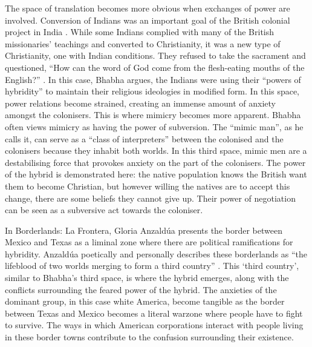 	The space of translation becomes more obvious when exchanges of power are involved. Conversion of Indians was an important goal of the British colonial project in India \parencite {Bhabha_1994}. While some Indians complied with many of the British missionaries’ teachings and converted to Christianity, it was a new type of Christianity, one with Indian conditions. They refused to take the sacrament and questioned, “How can the word of God come from the flesh-eating mouths of the English?” \parencite[166] {Bhabha_1994}. In this case, Bhabha argues, the Indians were using their “powers of hybridity” \parencite[167] {Bhabha_1994} to maintain their religious ideologies in modified form. In this space, power relations become strained, creating an immense amount of anxiety amongst the colonisers. This is where mimicry becomes more apparent. Bhabha often views mimicry as having the power of subversion. The “mimic man”, as he calls it, can serve as a “class of interpreters” \parencite [124] {Bhabha_1994} between the colonised and the colonisers because they inhabit both worlds. In this third space, mimic men are a destabilising force that provokes anxiety on the part of the colonisers. The power of the hybrid is demonstrated here: the native population knows the British want them to become Christian, but however willing the natives are to accept this change, there are some beliefs they cannot give up. Their power of negotiation can be seen as a subversive act towards the coloniser. 
	
	In Borderlands: La Frontera, Gloria Anzaldúa presents the border between Mexico and Texas as a liminal zone where there are political ramifications for hybridity. Anzaldúa poetically and personally describes these borderlands as “the lifeblood of two worlds merging to form a third country” \parencite [3] {Anzaldua_1987}. This ‘third country’, similar to Bhabha’s third space, is where the hybrid emerges, along with the conflicts surrounding the feared power of the hybrid. The anxieties of the dominant group, in this case white America, become tangible as the border between Texas and Mexico becomes a literal warzone \parencite [11] {Anzaldua_1987}where people have to fight to survive. The ways in which American corporations interact with people living in these border towns contribute to the confusion surrounding their existence. 
	
